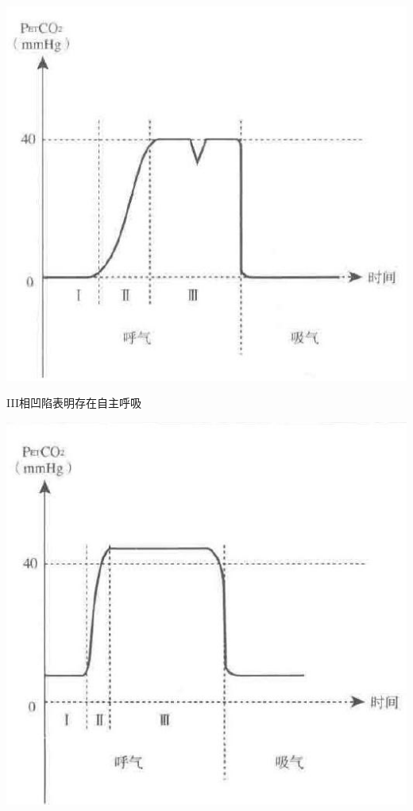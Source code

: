 \documentclass[10pt]{article}
\begin{document}
\begin{center}
\includegraphics[max width=\textwidth]{2024_07_05_645bb794a4d4f32ee0c8g-099}
\end{center}

III相凹陷表明存在自主呼吸

\begin{center}
\includegraphics[max width=\textwidth]{2024_07_05_645bb794a4d4f32ee0c8g-099(1)}
\end{center}
\end{document}

